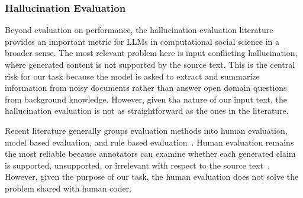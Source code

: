 \documentclass{article}
\begin{document}

\subsubsection{Hallucination Evaluation
}\label{hallucination-evaluation-literature}

Beyond evaluation on performance, the hallucination evaluation literature provides an important metric for LLMs in computational social science in a broader sense. The most relevant problem here is input conflicting hallucination, where generated content is not supported by the source text. This is the central risk for our task because the model is asked to extract and summarize information from noisy documents rather than answer open domain questions from background knowledge. However, given tha nature of our input text, the hallucination evaluation is not as straightforward as the ones in the literature.

Recent literature generally groups evaluation methods into human evaluation, model based evaluation, and rule based evaluation~\cite{Zhang_etal2025}. Human evaluation remains the most reliable because annotators can examine whether each generated claim is supported, unsupported, or irrelevant with respect to the source text~\cite{Min_etal2023}. However, given the purpose of our task, the human evaluation does not solve the problem shared with human coder.
\end{document}
